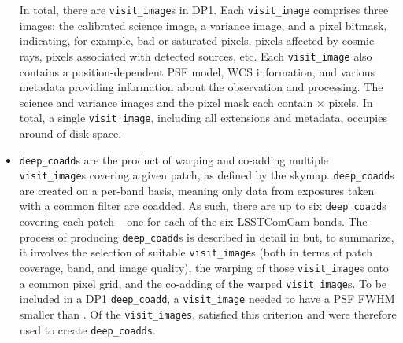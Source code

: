 \begin{itemize}
In total, there are \nvisitimages \texttt{visit\_image}s in \gls{DP1}.
Each \texttt{visit\_image}  comprises three images: the calibrated science image, a variance image, and a pixel bitmask, indicating, for example, bad or saturated pixels, pixels affected by cosmic rays, pixels associated with detected sources, etc.
Each \texttt{visit\_image} also contains a position-dependent \gls{PSF} model, \gls{WCS} information, and various \gls{metadata} providing information about the observation and processing.
The science and variance images and the pixel mask each contain \nvisitimagepixx$\times$ \nvisitimagepixy pixels.
In total, a single \texttt{visit\_image}, including all extensions and \gls{metadata}, occupies around \visitimagehdd of disk space.





\item \texttt{deep\_coadd}s \citep{10.71929/rubin/2570313} are the product of warping and co-adding multiple \texttt{visit\_image}s covering a given \gls{patch}, as defined by the skymap.
\texttt{deep\_coadd}s are created on a per-band basis, meaning only data from exposures taken with a common filter are coadded.
As such, there are up to six \texttt{deep\_coadd}s covering each \gls{patch} -- one for each of the six \gls{LSSTComCam} bands.
The process of producing \texttt{deep\_coadd}s is described in detail in  but, to summarize, it involves the selection of suitable \texttt{visit\_image}s (both in terms of \gls{patch} coverage, band, and image quality), the warping of those \texttt{visit\_image}s onto a common pixel grid, and the co-adding of the warped \texttt{visit\_image}s.
To be included in a \gls{DP1} \texttt{deep\_coadd}, a \texttt{visit\_image} needed to have a \gls{PSF} \gls{FWHM} smaller than \deepcoaddmaxfwhm. Of the \nvisitimages \texttt{visit\_images}, \ndeepcoaddvisitimages satisfied this criterion and were therefore used to create \texttt{deep\_coadds}.


\end{itemize}
